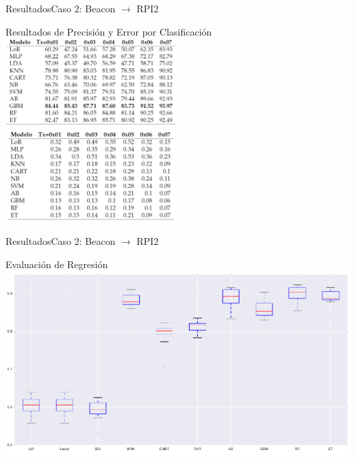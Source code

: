 \documentclass[10pt]{beamer}
\begin{document}
\begin{frame}{Resultados}{Caso 2: Beacon $\rightarrow$ RPI2}
\begin{block}{Resultados de Precisión y Error por Clasificación}
\includegraphics[width=0.5\textwidth]{AAUgraphics/raspClasificacion}
\includegraphics[width=0.5\textwidth]{AAUgraphics/raspClasificacionErr}
\end{block}
\end{frame}
\begin{frame}{Resultados}{Caso 2: Beacon $\rightarrow$ RPI2}
\begin{block}{Evaluación de Regresión}
\includegraphics[width=1.0\textwidth]{AAUgraphics/rasTx07Reg}
\end{block}
\end{frame}
\end{document}
